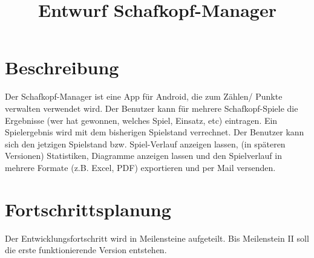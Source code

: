 \documentclass[10pt,a4paper]{report}
\begin{document}
	\title{Entwurf Schafkopf-Manager}
	\section{Beschreibung}
	Der Schafkopf-Manager ist eine App für Android, die zum Zählen/ Punkte verwalten verwendet wird. Der Benutzer kann für mehrere Schafkopf-Spiele die Ergebnisse (wer hat gewonnen, welches Spiel, Einsatz, etc) eintragen. Ein Spielergebnis wird mit dem bisherigen Spielstand verrechnet. Der Benutzer kann sich den jetzigen Spielstand bzw. Spiel-Verlauf anzeigen lassen, (in späteren Versionen) Statistiken, Diagramme anzeigen lassen und den Spielverlauf in mehrere Formate (z.B. Excel, PDF) exportieren und per Mail versenden.
	
	\section{Fortschrittsplanung}
	Der Entwicklungsfortschritt wird in Meilensteine aufgeteilt. Bis Meilenstein II soll die erste funktionierende Version entstehen.\\
	\\
\end{document}
